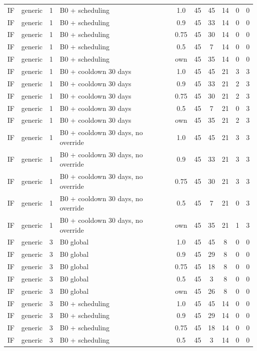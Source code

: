 \documentclass[10pt,onecolumn,letterpaper]{article}
\begin{document}
\begin{longtable}{lllp{4.4cm}cccccc}
IF & generic & 1 & B0 + scheduling & 1.0 & 45 & 45 & 14 & 0 & 0 \\
IF & generic & 1 & B0 + scheduling & 0.9 & 45 & 33 & 14 & 0 & 0 \\
IF & generic & 1 & B0 + scheduling & 0.75 & 45 & 30 & 14 & 0 & 0 \\
IF & generic & 1 & B0 + scheduling & 0.5 & 45 & 7 & 14 & 0 & 0 \\
IF & generic & 1 & B0 + scheduling & own & 45 & 35 & 14 & 0 & 0 \\
IF & generic & 1 & B0 + cooldown 30 days & 1.0 & 45 & 45 & 21 & 3 & 3 \\
IF & generic & 1 & B0 + cooldown 30 days & 0.9 & 45 & 33 & 21 & 2 & 3 \\
IF & generic & 1 & B0 + cooldown 30 days & 0.75 & 45 & 30 & 21 & 2 & 3 \\
IF & generic & 1 & B0 + cooldown 30 days & 0.5 & 45 & 7 & 21 & 0 & 3 \\
IF & generic & 1 & B0 + cooldown 30 days & own & 45 & 35 & 21 & 2 & 3 \\
IF & generic & 1 & B0 + cooldown 30 days, no override & 1.0 & 45 & 45 & 21 & 3 & 3 \\
IF & generic & 1 & B0 + cooldown 30 days, no override & 0.9 & 45 & 33 & 21 & 3 & 3 \\
IF & generic & 1 & B0 + cooldown 30 days, no override & 0.75 & 45 & 30 & 21 & 3 & 3 \\
IF & generic & 1 & B0 + cooldown 30 days, no override & 0.5 & 45 & 7 & 21 & 0 & 3 \\
IF & generic & 1 & B0 + cooldown 30 days, no override & own & 45 & 35 & 21 & 1 & 3 \\
IF & generic & 3 & B0 global & 1.0 & 45 & 45 & 8 & 0 & 0 \\
IF & generic & 3 & B0 global & 0.9 & 45 & 29 & 8 & 0 & 0 \\
IF & generic & 3 & B0 global & 0.75 & 45 & 18 & 8 & 0 & 0 \\
IF & generic & 3 & B0 global & 0.5 & 45 & 3 & 8 & 0 & 0 \\
IF & generic & 3 & B0 global & own & 45 & 26 & 8 & 0 & 0 \\
IF & generic & 3 & B0 + scheduling & 1.0 & 45 & 45 & 14 & 0 & 0 \\
IF & generic & 3 & B0 + scheduling & 0.9 & 45 & 29 & 14 & 0 & 0 \\
IF & generic & 3 & B0 + scheduling & 0.75 & 45 & 18 & 14 & 0 & 0 \\
IF & generic & 3 & B0 + scheduling & 0.5 & 45 & 3 & 14 & 0 & 0 \\

\end{longtable}
\end{document}
